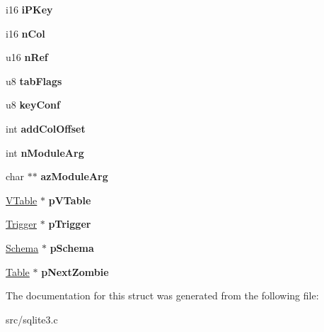 \begin{DoxyCompactItemize}
\item 
\hypertarget{struct_table_af5e592498393a990cb1344555fa86409}{i16 {\bfseries i\-P\-Key}}\label{struct_table_af5e592498393a990cb1344555fa86409}

\item 
\hypertarget{struct_table_a1a8346811ba23fdfd90c5b54076bbefb}{i16 {\bfseries n\-Col}}\label{struct_table_a1a8346811ba23fdfd90c5b54076bbefb}

\item 
\hypertarget{struct_table_a5c3d59f52186917d412d42e008dd302c}{u16 {\bfseries n\-Ref}}\label{struct_table_a5c3d59f52186917d412d42e008dd302c}

\item 
\hypertarget{struct_table_ab0aeb112ae7e1b81e2a18bc493f7992c}{u8 {\bfseries tab\-Flags}}\label{struct_table_ab0aeb112ae7e1b81e2a18bc493f7992c}

\item 
\hypertarget{struct_table_add1b22425db781d976d25b4465a2965a}{u8 {\bfseries key\-Conf}}\label{struct_table_add1b22425db781d976d25b4465a2965a}

\item 
\hypertarget{struct_table_ab6f1ad10bce5c20faca55cd0a9c3f1ff}{int {\bfseries add\-Col\-Offset}}\label{struct_table_ab6f1ad10bce5c20faca55cd0a9c3f1ff}

\item 
\hypertarget{struct_table_a74a2c5547ea876ebe77dbea0d99361bf}{int {\bfseries n\-Module\-Arg}}\label{struct_table_a74a2c5547ea876ebe77dbea0d99361bf}

\item 
\hypertarget{struct_table_af3af6596efa41894bcd3c3c9f9b6781f}{char $\ast$$\ast$ {\bfseries az\-Module\-Arg}}\label{struct_table_af3af6596efa41894bcd3c3c9f9b6781f}

\item 
\hypertarget{struct_table_a7b9903cfbfefe7b8bf872c4f50cb2e95}{\hyperlink{struct_v_table}{V\-Table} $\ast$ {\bfseries p\-V\-Table}}\label{struct_table_a7b9903cfbfefe7b8bf872c4f50cb2e95}

\item 
\hypertarget{struct_table_aca61c40bb0164f2c6fc3406c28988660}{\hyperlink{struct_trigger}{Trigger} $\ast$ {\bfseries p\-Trigger}}\label{struct_table_aca61c40bb0164f2c6fc3406c28988660}

\item 
\hypertarget{struct_table_a1d6ce038a061722cebaeba0f3ffceacf}{\hyperlink{struct_schema}{Schema} $\ast$ {\bfseries p\-Schema}}\label{struct_table_a1d6ce038a061722cebaeba0f3ffceacf}

\item 
\hypertarget{struct_table_ae365eb0d8f6d3cb39f3908323cba45e4}{\hyperlink{struct_table}{Table} $\ast$ {\bfseries p\-Next\-Zombie}}\label{struct_table_ae365eb0d8f6d3cb39f3908323cba45e4}

\end{DoxyCompactItemize}


The documentation for this struct was generated from the following file\-:\begin{DoxyCompactItemize}
\item 
src/sqlite3.\-c\end{DoxyCompactItemize}
